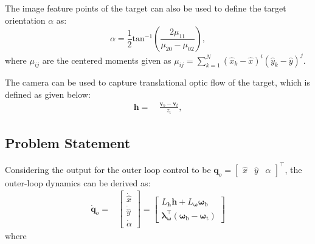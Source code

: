 \documentclass[lettersize,journal]{IEEEtran}
\begin{document}
The image feature points of the target can also be used to define the target orientation $\alpha$ as:
\begin{equation} \label{Eq. (4)}
    \alpha = \frac{1}{2} \text{tan}^{-1}\left( \frac{2 \mu_{11}}{\mu_{20} - \mu_{02}}\right),
\end{equation}
where $\mu_{ij}$ are the centered moments given as $\mu_{ij} = \sum^{N}_{k=1} (\hat{x}_k - \hat{x})^i (\hat{y}_k - \hat{y})^j$.

The camera can be used to capture translational optic flow of the target, which is defined as given below:
\begin{align} \label{optic flow: equation}
    \boldsymbol{h} =& ~ \frac{\boldsymbol{v}_b - \boldsymbol{v}_t}{z_{\text{t}}},
\end{align}

\subsection{Problem Statement} \label{problem statement: section}
Considering the output for the outer loop control to be $\boldsymbol{q}_o = \begin{bmatrix} \hat{x} & \hat{y} & \alpha \end{bmatrix}^{\top}$, the outer-loop dynamics can be derived as:
\begin{align}
    \dot{\boldsymbol{q}}_o =& \begin{bmatrix} \dot{\hat{x}} \\ \dot{\hat{y}} \\ \dot{\alpha} \end{bmatrix}
    = \begin{bmatrix}
    L_{\boldsymbol{h}} \boldsymbol{h} + L_{\boldsymbol{\omega}} \boldsymbol{\omega}_{\text{b}} \\
    \boldsymbol{\lambda}_{\boldsymbol{\omega}}^{\top} \left( \boldsymbol{\omega}_{\text{b}} - \boldsymbol{\omega}_{\text{t}} \right)
    \end{bmatrix}
\end{align}where 
\end{document}
